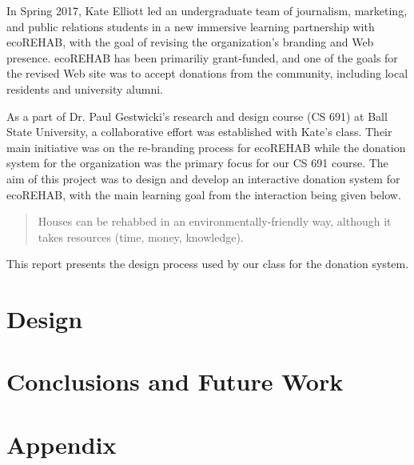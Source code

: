 \documentclass[letter]{article}
\begin{document}
In Spring 2017, Kate Elliott led an undergraduate team of journalism,
marketing, and public relations students in a new immersive learning
partnership with ecoREHAB, with the goal of revising the organization's
branding and Web presence.
ecoREHAB has been primariliy grant-funded, and one of the 
goals for the revised Web site was to accept donations from
the community, including local residents and university alumni.

As a part of Dr. Paul Gestwicki's research and design course (CS 691) at Ball State University, a collaborative effort was established with Kate's class. Their main initiative was on the re-branding process for ecoREHAB while the donation system for the organization was the primary focus for our CS 691 course. The aim of this project was to design and develop an interactive donation system for ecoREHAB, with the main learning goal from the interaction being given below.

\begin{quote}
	Houses can be rehabbed in an environmentally-friendly way, although it takes resources (time, money, knowledge).
\end{quote}

This report presents the design process used by our class for the donation system.

\section*{Design}

\section*{Conclusions and Future Work}

\section*{Appendix}

\end{document}
